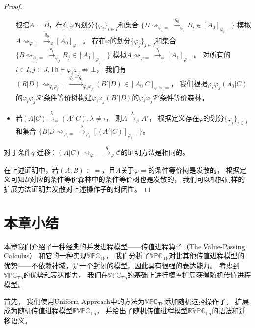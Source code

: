 \begin{proof}
\begin{itemize}
{         根据$A=B$，存在$\varphi$的划分$\{\varphi_i\}_{i\in I}$和集合
         $\{B\rightsquigarrow_{\varphi_i=}\stackrel{q_0}{\rightarrow}_{\varphi_i}B_i\in [A_0]_{\varphi_i =}\}$
         模拟$A\rightsquigarrow_{\varphi = }\stackrel{q_0}{\rightarrow}_{\varphi}[A_0]_{\varphi=}$。
         存在$\varphi$的划分$\{\varphi_j\}_{j\in J}$和集合
         $\{B\rightsquigarrow_{\varphi_j=}\stackrel{q_1}{\rightarrow}_{\varphi_j}B_j\in [A_1]_{\varphi_j =}\}$
         模拟$A\rightsquigarrow_{\varphi = }\stackrel{q_1}{\rightarrow}_{\varphi}[A_1]_{\varphi=}$。
         对所有的$i\in I, j\in J, \mathsf{Th}\vdash \varphi_i\varphi_j\not\Rightarrow \bot$，
         我们有$(B|D)\rightsquigarrow_{\varphi_i\varphi_j=}\stackrel{q_0+q_1}{\longrightarrow}_{\varphi_i\varphi_j}(B'|D)\in[A_0|C]_{\varphi_i\varphi_j=}$，
         我们根据$\varphi_i\varphi_j (A_0|C)$的$\varphi_i\varphi_j \mathcal{R}' $条件等价树构建$\varphi_i\varphi_j(B'|D)$的$\varphi_i\varphi_j \mathcal{R}' $条件等价森林。
      }
      \item {
         若$(A|C)\stackrel{\lambda}{\rightarrow}_{\varphi} (A'|C), \lambda\neq \tau$，
         则$A\stackrel{\lambda}{\rightarrow}_{\varphi} A'$，
         根据定义存在$\varphi$的划分$\{\varphi_i\}_{i\in I}$和集合
         $\{B|D\rightsquigarrow_{\varphi_i=}\stackrel{\lambda}{\rightarrow}_{\varphi_i} [(A'|C)]_{\varphi_i=}\}$。
      }
   \end{itemize}
   对于条件$q$-迁移：$(A|C)\rightsquigarrow_{\varphi=}\stackrel{q}{\rightarrow}_{\varphi}\mathcal{C}$的证明方法是相同的。

   在上述证明中，若$(A,B)\in =$，且$A$关于$\varphi =$的条件等价树是发散的，
   根据定义可知$B$对应的条件等价森林中的条件等价树也是发散的，
   我们可以根据同样的扩展方法证明共发散对上述操作子的封闭性。
\end{proof}

\section{本章小结}
本章我们介绍了一种经典的并发进程模型——传值进程算子（The Value-Passing Calculus）
和它的一种实现$\mathbb{VPC}_{\mathsf{Th}}$，
我们分析了$\mathbb{VPC}_{\mathsf{Th}}$对比其他传值进程模型的优势——不依赖神域，是一个封闭的模型，因此具有很强的表达能力。
考虑到$\mathbb{VPC}_{\mathsf{Th}}$的优势和表达能力，
我们在$\mathbb{VPC}_{\mathsf{Th}}$的基础上进行概率扩展获得随机传值进程模型。

首先，
我们使用Uniform Approach中的方法为$\mathbb{VPC}_{\mathsf{Th}}$添加随机选择操作子，
扩展成为随机传值进程模型$\mathbb{RVPC}_{\mathsf{Th}}$，
并给出了随机传值进程模型$\mathbb{RVPC}_{\mathsf{Th}}$的语法和迁移语义。

